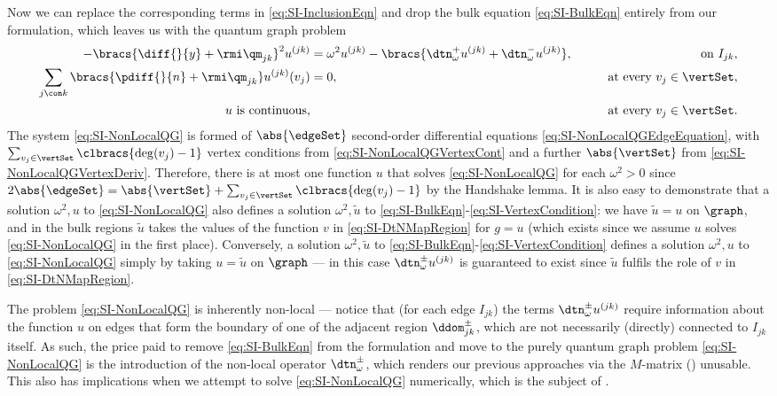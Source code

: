 Now we can replace the corresponding terms in \eqref{eq:SI-InclusionEqn} and drop the bulk equation \eqref{eq:SI-BulkEqn} entirely from our formulation, which leaves us with the quantum graph problem
\begin{subequations} \label{eq:SI-NonLocalQG}
	\begin{align}
		- \bracs{\diff{}{y} + \rmi\qm_{jk}}^2u^{(jk)} 
	&= \omega^2 u^{(jk)} - \bracs{ \dtn^+_\omega u^{(jk)} + \dtn^-_\omega u^{(jk)}},
	&\qquad\text{on } I_{jk}, \label{eq:SI-NonLocalQGEdgeEquation}  \\
	\sum_{j\con k} \bracs{\pdiff{}{n}+\rmi\qm_{jk}} u^{(jk)}(v_j) &= 0,
	&\qquad\text{at every } v_j\in\vertSet, \label{eq:SI-NonLocalQGVertexDeriv} \\
	u \text{ is continuous,} & 
	&\qquad\text{at every } v_j\in\vertSet. \label{eq:SI-NonLocalQGVertexCont}
	\end{align}
\end{subequations}
The system \eqref{eq:SI-NonLocalQG} is formed of $\abs{\edgeSet}$ second-order differential equations \eqref{eq:SI-NonLocalQGEdgeEquation}, with $\sum_{v_j\in\vertSet}\clbracs{\deg(v_j)-1}$ vertex conditions from \eqref{eq:SI-NonLocalQGVertexCont} and a further $\abs{\vertSet}$ from \eqref{eq:SI-NonLocalQGVertexDeriv}.
Therefore, there is at most one function $u$ that solves \eqref{eq:SI-NonLocalQG} for each $\omega^2>0$ since $2\abs{\edgeSet} = \abs{\vertSet} + \sum_{v_j\in\vertSet}\clbracs{\deg(v_j)-1}$ by the Handshake lemma.
It is also easy to demonstrate that a solution $\omega^2, u$ to \eqref{eq:SI-NonLocalQG} also defines a solution $\omega^2, \tilde{u}$ to \eqref{eq:SI-BulkEqn}-\eqref{eq:SI-VertexCondition}: we have $\tilde{u}=u$ on $\graph$, and in the bulk regions $\tilde{u}$ takes the values of the function $v$ in \eqref{eq:SI-DtNMapRegion} for $g=u$ (which exists since we assume $u$ solves \eqref{eq:SI-NonLocalQG} in the first place).
Conversely, a solution $\omega^2, \tilde{u}$ to \eqref{eq:SI-BulkEqn}-\eqref{eq:SI-VertexCondition} defines a solution $\omega^2, u$ to \eqref{eq:SI-NonLocalQG} simply by taking $u = \tilde{u}$ on $\graph$ --- in this case $\dtn^{\pm}_\omega u^{(jk)}$ is guaranteed to exist since $\tilde{u}$ fulfils the role of $v$ in \eqref{eq:SI-DtNMapRegion}.

The problem \eqref{eq:SI-NonLocalQG} is inherently non-local --- notice that (for each edge $I_{jk}$) the terms $\dtn^{\pm}_\omega u^{(jk)}$ require information about the function $u$ on edges that form the boundary of one of the adjacent region $\ddom_{jk}^{\pm}$, which are not necessarily (directly) connected to $I_{jk}$ itself.
As such, the price paid to remove \eqref{eq:SI-BulkEqn} from the formulation and move to the purely quantum graph problem \eqref{eq:SI-NonLocalQG} is the introduction of the non-local operator $\dtn^{\pm}_\omega$, which renders our previous approaches via the $M$-matrix () unusable.
This also has implications when we attempt to solve \eqref{eq:SI-NonLocalQG} numerically, which is the subject of .

